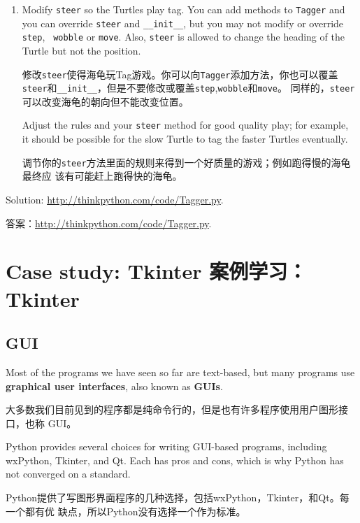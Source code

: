 \documentclass[10pt]{book}
\begin{document}
\begin{CJK}{UTF8}{gbsn}
\begin{exercise}
\begin{enumerate}
\item Modify {\tt steer} so the Turtles play tag.  You can add methods
  to {\tt Tagger} and you can override {\tt steer} and
  \verb"__init__", but you may not modify or override {\tt step}, {\tt
    wobble} or {\tt move}.  Also, {\tt steer} is allowed to change the
  heading of the Turtle but not the position.

  修改{\tt steer}使得海龟玩Tag游戏。你可以向{\tt Tagger}添加方法，你也可以覆盖
  {\tt steer}和\verb"__init__"，但是不要修改或覆盖{\tt step},{\tt wobble}和{\tt move}。
  同样的，{\tt steer}可以改变海龟的朝向但不能改变位置。

Adjust the rules and your {\tt steer} method for good quality play;
for example, it should be possible for the slow Turtle to tag the
faster Turtles eventually.

调节你的{\tt steer}方法里面的规则来得到一个好质量的游戏；例如跑得慢的海龟最终应
该有可能赶上跑得快的海龟。

\end{enumerate}

Solution: \url{http://thinkpython.com/code/Tagger.py}.

答案：\url{http://thinkpython.com/code/Tagger.py}.

\end{exercise}



\chapter{Case study: Tkinter  案例学习：Tkinter}
\label{tkinter}

\section{GUI}

Most of the programs we have seen so far are text-based, but
many programs use {\bf graphical user interfaces}, also
known as {\bf GUIs}.

大多数我们目前见到的程序都是纯命令行的，但是也有许多程序使用用户图形接口，也称
GUI。

Python provides several choices for writing GUI-based programs,
including wxPython, Tkinter, and Qt.  Each has pros and cons, which
is why Python has not converged on a standard.

Python提供了写图形界面程序的几种选择，包括wxPython，Tkinter，和Qt。每一个都有优
缺点，所以Python没有选择一个作为标准。


\end{CJK}
\end{document}
